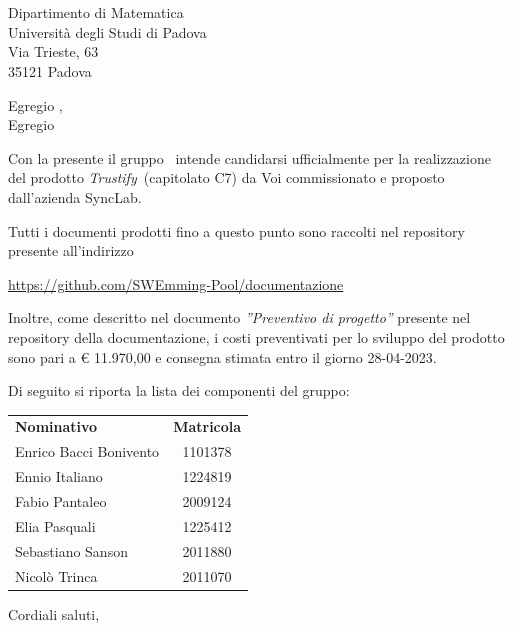 \documentclass[12pt, boldsubject, italicsignature, noindent]{letteracdp}
\date{}
\renewcommand{\capName}{\textit{Trustify}} %
\renewcommand{\capCode}{C7} %
\renewcommand{\capProposer}{SyncLab} %
\begin{document}
\begin{letter}{
    \Vardanega \\
    \Cardin \\
    Dipartimento di Matematica \\
    Università degli Studi di Padova \\
    Via Trieste, 63 \\ 35121 Padova
}

\opening{Egregio \vardanega,\\ Egregio \cardin}

Con la presente il gruppo \groupName\ intende candidarsi ufficialmente per la realizzazione del prodotto \capName\ (capitolato \capCode) da Voi commissionato e proposto dall'azienda \capProposer.

Tutti i documenti prodotti fino a questo punto sono raccolti nel repository presente all'indirizzo 
\begin{center}
    \url{https://github.com/SWEmming-Pool/documentazione}
\end{center}

Inoltre, come descritto nel documento \textit{''Preventivo di progetto''} presente nel repository della documentazione, i costi preventivati per lo sviluppo del prodotto sono pari a \euro{} 11.970,00 e consegna stimata entro il giorno 28-04-2023.

\pagebreak

Di seguito si riporta la lista dei componenti del gruppo:

\begin{center}
    \begin{tabular}{l|c}
    \textbf{Nominativo} & \textbf{Matricola} \\
    Enrico Bacci Bonivento & 1101378 \\
	Ennio Italiano & 1224819 \\
	Fabio Pantaleo & 2009124 \\     
	Elia Pasquali & 1225412 \\	     
	Sebastiano Sanson & 2011880 \\
    Nicolò Trinca & 2011070
   \end{tabular}
\end{center}

\closing{Cordiali saluti,}

\end{letter}
\end{document}
